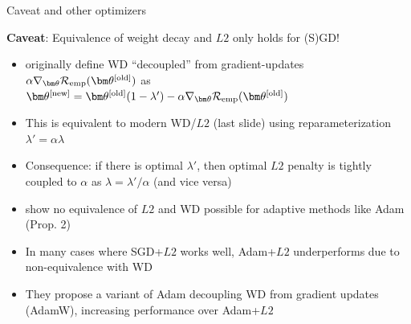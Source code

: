 \documentclass[11pt,compress,t,notes=noshow, xcolor=table]{beamer}
\begin{document}
\begin{vbframe}{Caveat and other optimizers}

\textbf{Caveat}: Equivalence of weight decay and $L2$ only holds for (S)GD!

\begin{itemize}\setlength{\itemsep}{0.5em}
    \item {} originally define WD ``decoupled'' from gradient-updates {\footnotesize $\alpha \nabla_{\thetav} \riske(\thetav^{[\text{old}]})$} as
    {\footnotesize $\thetav^{[\text{new}]} =
    \thetav^{[\text{old}]} (1 - \lambda') - \alpha \nabla_{\thetav} \riske(\thetav^{[\text{old}]})$}
    \item This is equivalent to modern WD/$L2$ (last slide) using reparameterization $\lambda'=\alpha \lambda$
    \item Consequence: if there is optimal $\lambda'$, then optimal $L2$ penalty is tightly coupled to $\alpha$ as $\lambda=\lambda'/ \alpha$ (and vice versa)
    
    \item {} show no equivalence of $L2$ and WD possible for adaptive methods like Adam (Prop. 2)
    \item In many cases where SGD+$L2$ works well, Adam+$L2$ underperforms due to non-equivalence with WD
    \item They propose a variant of Adam decoupling WD from gradient updates (AdamW), increasing performance over Adam+$L2$
\end{itemize}




\end{vbframe}


\endlecture
\end{document}
